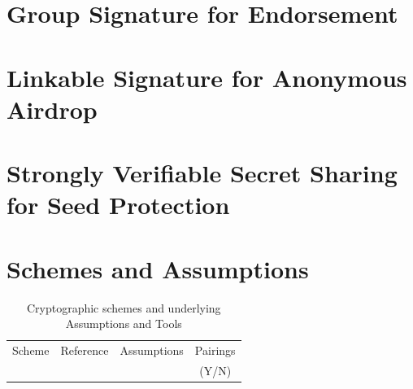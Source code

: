\documentclass[11pt]{llncs2e/llncs}
\begin{document}
\section{Group Signature for Endorsement}


\section{Linkable Signature for Anonymous Airdrop}

\section{Strongly Verifiable Secret Sharing for Seed Protection}

\section{Schemes and Assumptions}

\begin{table}
\begin{center}
 
 \begin{tabular}{|c|c|c|c|}
 \hline
 Scheme & Reference & Assumptions & Pairings \\
   &&& (Y/N)\\ 
 \hline
 \end{tabular}
\end{center}
\caption{Cryptographic schemes and underlying Assumptions and Tools}
\end{table}
\end{document}

